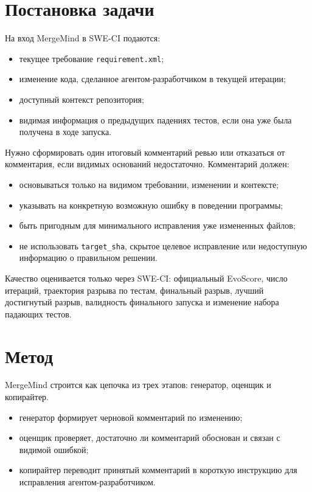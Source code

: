 \documentclass[12pt,a4paper]{article}
\begin{document}
\section{Постановка задачи}

На вход MergeMind в SWE-CI подаются:

\begin{itemize}
  \item текущее требование \texttt{requirement.xml};
  \item изменение кода, сделанное агентом-разработчиком в текущей итерации;
  \item доступный контекст репозитория;
  \item видимая информация о предыдущих падениях тестов, если она уже была
    получена в ходе запуска.
\end{itemize}

Нужно сформировать один итоговый комментарий ревью или отказаться от
комментария, если видимых оснований недостаточно. Комментарий должен:

\begin{itemize}
  \item основываться только на видимом требовании, изменении и контексте;
  \item указывать на конкретную возможную ошибку в поведении программы;
  \item быть пригодным для минимального исправления уже измененных файлов;
  \item не использовать \texttt{target\_sha}, скрытое целевое исправление или
    недоступную информацию о правильном решении.
\end{itemize}

Качество оценивается только через SWE-CI: официальный EvoScore, число итераций,
траектория разрыва по тестам, финальный разрыв, лучший достигнутый разрыв,
валидность финального запуска и изменение набора падающих тестов.

\section{Метод}

MergeMind строится как цепочка из трех этапов: генератор, оценщик и
копирайтер.

\begin{itemize}
  \item генератор формирует черновой комментарий по изменению;
  \item оценщик проверяет, достаточно ли комментарий обоснован и связан с
    видимой ошибкой;
  \item копирайтер переводит принятый комментарий в короткую инструкцию для
    исправления агентом-разработчиком.
\end{itemize}
\end{document}
